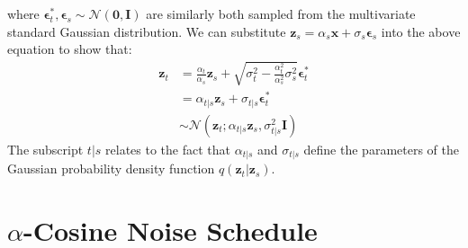 \documentclass[ oneside,%
                    author={George Herbert},
                    degree={MSci},
                     title={Video Diffusion Models for Climate Simulations},
                  subtitle={}]{dissertation}
\begin{document}
where $\boldsymbol\epsilon_t^*, \boldsymbol\epsilon_s\sim\mathcal{N}(\mathbf{0}, \mathbf{I})$ are similarly both sampled from the multivariate standard Gaussian distribution. We can substitute $\mathbf{z}_s=\alpha_s\mathbf{x}+\sigma_s\boldsymbol\epsilon_s$ into the above equation to show that:
\begin{align}
      \mathbf{z}_t&=\frac{\alpha_t}{\alpha_s}\mathbf{z}_s+\sqrt{\sigma_t^2-\frac{\alpha_t^2}{\alpha_s^2}\sigma_s^2}\boldsymbol\epsilon_t^*\\
      &=\alpha_{t|s}\mathbf{z}_s+\sigma_{t|s}\boldsymbol\epsilon_t^*\\
      &\sim\mathcal{N}\left(\mathbf{z}_t;\alpha_{t|s}\mathbf{z}_s,\sigma_{t|s}^2\mathbf{I}\right)
\end{align}
The subscript $t|s$ relates to the fact that $\alpha_{t|s}$ and $\sigma_{t|s}$ define the parameters of the Gaussian probability density function $q(\mathbf{z}_t|\mathbf{z}_s)$.

\section{$\alpha$-Cosine Noise Schedule}
\label{appx:diffusion_cosine_noise_schedule}
\end{document}
